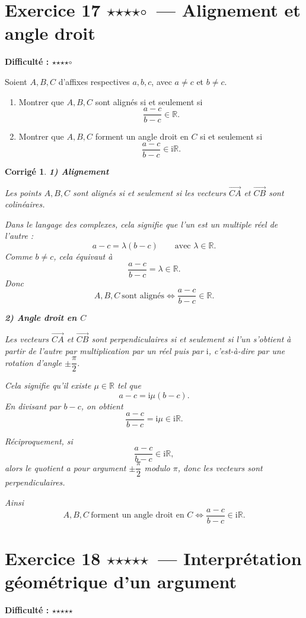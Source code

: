 \documentclass[11pt,a4paper]{article}
\newtheorem*{corrige}{Corrigé}
\newcommand{\R}{\mathbb{R}}
\newcommand{\ii}{\mathrm{i}}
\newcommand{\fullstar}{\(\star\)}
\newcommand{\emptystar}{\(\circ\)}
\newcommand{\fourStars}{\fullstar\fullstar\fullstar\fullstar\emptystar}
\newcommand{\fiveStars}{\fullstar\fullstar\fullstar\fullstar\fullstar}
\newcommand{\difficulty}[1]{\textbf{Difficulté : #1}}
\begin{document}
\section{Exercice 17 \fourStars\ --- Alignement et angle droit}
\difficulty{\fourStars}

Soient \(A,B,C\) d'affixes respectives \(a,b,c\), avec \(a\neq c\) et \(b\neq c\).

\begin{enumerate}
    \item Montrer que \(A,B,C\) sont alignés si et seulement si
    \[
    \frac{a-c}{b-c}\in\R.
    \]
    \item Montrer que \(A,B,C\) forment un angle droit en \(C\) si et seulement si
    \[
    \frac{a-c}{b-c}\in \ii\R.
    \]
\end{enumerate}

\begin{corrige}
\textbf{1) Alignement}

Les points \(A,B,C\) sont alignés si et seulement si les vecteurs \(\overrightarrow{CA}\) et \(\overrightarrow{CB}\) sont colinéaires.

Dans le langage des complexes, cela signifie que l'un est un multiple réel de l'autre :
\[
a-c=\lambda(b-c)
\qquad \text{avec } \lambda\in\R.
\]
Comme \(b\neq c\), cela équivaut à
\[
\frac{a-c}{b-c}=\lambda\in\R.
\]
Donc
\[
\boxed{A,B,C\ \text{sont alignés} \iff \frac{a-c}{b-c}\in\R.}
\]

\textbf{2) Angle droit en \(C\)}

Les vecteurs \(\overrightarrow{CA}\) et \(\overrightarrow{CB}\) sont perpendiculaires si et seulement si l'un s'obtient à partir de l'autre par multiplication par un réel puis par \(\ii\), c'est-à-dire par une rotation d'angle \(\pm \dfrac{\pi}{2}\).

Cela signifie qu'il existe \(\mu\in\R\) tel que
\[
a-c=\ii\mu (b-c).
\]
En divisant par \(b-c\), on obtient
\[
\frac{a-c}{b-c}=\ii\mu\in \ii\R.
\]

Réciproquement, si
\[
\frac{a-c}{b-c}\in \ii\R,
\]
alors le quotient a pour argument \(\pm \dfrac{\pi}{2}\) modulo \(\pi\), donc les vecteurs sont perpendiculaires.

Ainsi
\[
\boxed{A,B,C\ \text{forment un angle droit en }C \iff \frac{a-c}{b-c}\in \ii\R.}
\]
\end{corrige}

\section{Exercice 18 \fiveStars\ --- Interprétation géométrique d'un argument}
\difficulty{\fiveStars}
\end{document}

